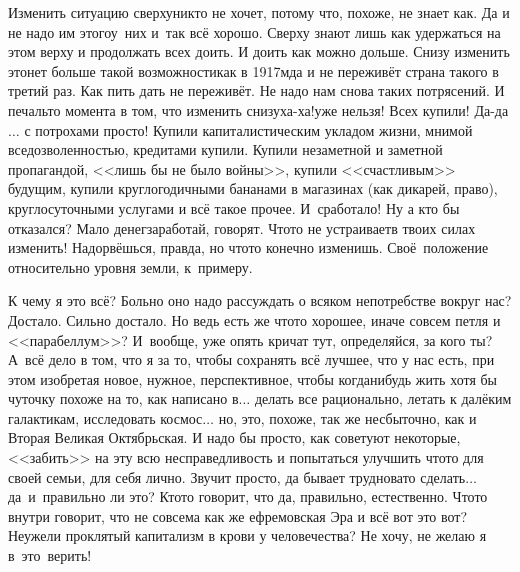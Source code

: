 Изменить ситуацию сверху\mdash никто не хочет, потому что, похоже, не знает как. Да и не надо им этого\mdash у~них и~так всё хорошо. Сверху знают лишь как удержаться на этом верху и продолжать всех доить. И доить как можно дольше. Снизу изменить это\mdash нет больше такой возможности\mdash как в 1917\sdash м\mdash да и не переживёт страна такого в третий раз. Как пить дать не переживёт. Не надо нам снова таких потрясений. И печаль\sdash то момента в том, что изменить снизу\mdash ха-ха!\mdash уже нельзя! Всех купили! Да-да$\ldots$ с потрохами просто! Купили капиталистическим укладом жизни, мнимой вседозволенностью, кредитами купили. Купили незаметной и заметной пропагандой, <<лишь бы не было войны>>, купили <<счастливым>> будущим, купили круглогодичными бананами в магазинах (как дикарей, право), круглосуточными услугами и всё такое прочее. И~сработало! Ну а кто бы отказался? Мало денег\mdash заработай, говорят. Что\sdash то не устраивает\mdash в твоих силах изменить! Надорвёшься, правда, но что\sdash то конечно изменишь. Своё~положение относительно уровня земли, к~примеру.

К чему я это всё? Больно оно надо рассуждать о всяком непотребстве вокруг нас? Достало. Сильно достало. Но ведь есть же что\sdash то хорошее, иначе совсем петля и <<парабеллум>>? И~вообще, уже опять кричат тут, определяйся, за кого ты? А~всё дело в том, что я за то, чтобы сохранять всё лучшее, что у нас есть, при этом изобретая новое, нужное, перспективное, чтобы когда\sdash нибудь жить хотя бы чуточку похоже на то, как написано в\cite{ТуманностьАндромеды}$\ldots$ делать все рационально, летать к далёким галактикам, исследовать космос$\ldots$ но, это, похоже, так же несбыточно, как и Вторая Великая Октябрьская. И надо бы просто, как советуют некоторые, <<забить>> на эту всю несправедливость и попытаться улучшить что\sdash то для своей семьи, для себя лично. Звучит просто, да бывает трудновато сделать$\ldots$ да~и~правильно ли это? Кто\sdash то говорит, что да, правильно, естественно. Что\sdash то внутри говорит, что не совсем\mdash а как же ефремовская Эра и всё вот это вот? Неужели проклятый капитализм в крови у человечества? Не хочу, не желаю я в~это~верить! %


